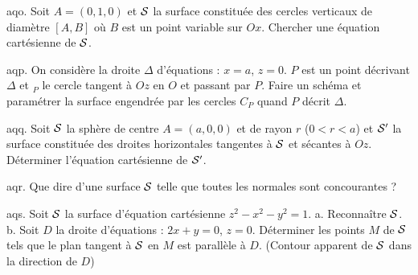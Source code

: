 \exo [Level=2,Fight=2,Learn=2,Type=\TravauxDirigés,Field=\Surfaces,Origin=Quercia,Solution={$y(x^2+(y-1)^2 + z^2) = z^2$.}] aqo.
Soit $A=(0,1,0)$ et ${\cal S}$ la surface constituée des cercles verticaux de
diamètre $[A,B]$ où $B$ est un point variable sur $Ox$. Chercher une
équation cartésienne de ${\cal S}$.

\exo [Level=2,Fight=2,Learn=2,Type=\TravauxDirigés,Field=\Surfaces,Origin={Chimie P' 91},Solution={$x={a\over 2}(1+\cos u)$,
    $y={v \over 2}(1+\cos u)$,
$z={\sqrt{a^2+v^2}\over 2}\sin u$.}] aqp. 
On considère la droite $\Delta$ d'équations : $x=a$, $z=0$.
$P$ est un point décrivant $\Delta$ et $_P$ le cercle tangent à $Oz$ en
$O$ et passant par $P$. Faire un schéma et paramétrer la surface engendrée par les cercles $C_P$ quand $P$ décrit $\Delta$.

\exo [Level=2,Fight=2,Learn=2,Type=\TravauxDirigés,Field=\Surfaces,Origin=Quercia,Solution={$a^2y^2 = (x^2+y^2)(r^2-z^2)$.}] aqq.
Soit ${\cal S}$ la sphère de centre $A=(a,0,0)$ et de rayon $r$ ($0 < r < a$) et
${\cal S}'$ la surface constituée des droites horizontales tangentes à ${\cal S}$
et sécantes à $Oz$. Déterminer l'équation cartésienne de ${\cal S}'$.

\exo [Level=2,Fight=3,Learn=3,Type=\TravauxDirigés,Field=\Surfaces,Origin=Quercia,Solution=] aqr.
Que dire d'une surface ${\cal S}$ telle que toutes les normales sont
concourantes ?

\exo [Level=2,Fight=2,Learn=2,Type=\TravauxDirigés,Field=\Surfaces,Origin=Quercia,Solution={a. Hyperboloïde de révolution à deux nappes.\PAR\noindent
b. $x = 2y$, $z^2 = 1 + 5y^2$.
}] aqs.
Soit ${\cal S}$ la surface d'équation cartésienne $z^2-x^2-y^2 = 1$. \PAR\noindent
a. Reconnaître ${\cal S}$. \PAR\noindent
b. Soit $D$ la droite d'équations : $2x+y = 0$, $z=0$. Déterminer les points $M$ de ${\cal S}$ tels que le plan tangent à ${\cal S}$ en $M$ est parallèle à $D$. (Contour apparent de ${\cal S}$ dans la direction de $D$)



\endinput